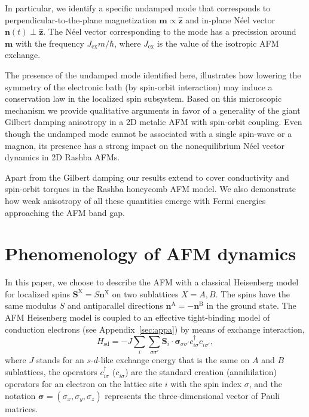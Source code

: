 \documentclass[%
  twocolumn,
  aps,
  prb,
  amsmath,
  amssymb,
  superscriptaddress,
  nofootinbib,
  floatfix
]{revtex4-1}
\newcommand{\s}{\sum\limits}
\newcommand{\be}{\begin{equation}}
\newcommand{\e}{\end{equation}}
\newcommand{\bb}{\boldsymbol}
\newcommand{\h}{^\dagger}
\newcommand{\0}{^{\phantom{\dagger}}}
\begin{document}
In particular, we identify a specific undamped mode that corresponds to perpendicular-to-the-plane magnetization $\bb{m} \propto \hat{\bb{z}}$ and in-plane N\'eel vector $\bb{n}(t) \perp \hat{\bb{z}}$. The N\'eel vector corresponding to the mode has a precission around $\bb{m}$ with the frequency $J_\textrm{ex} m/\hbar$, where $J_\textrm{ex}$ is the value of the isotropic AFM exchange.

The presence of the undamped mode identified here, illustrates how lowering the symmetry of the electronic bath (by spin-orbit interaction) may induce a conservation law in the localized spin subsystem. Based on this microscopic mechanism we provide qualitative arguments in favor of a generality of the giant Gilbert damping anisotropy in a 2D metalic AFM with spin-orbit coupling. Even though the undamped mode cannot be associated with a single spin-wave or a magnon, its presence has a strong impact on the nonequilibrium N\'eel vector dynamics in 2D Rashba AFMs.

Apart from the Gilbert damping our results extend to cover conductivity and spin-orbit torques in the Rashba honeycomb AFM model. We also demonstrate how weak anisotropy of all these quantities emerge with Fermi energies approaching the AFM band gap. 

\section{Phenomenology of AFM dynamics}

In this paper, we choose to describe the AFM with a classical Heisenberg model for localized spins $\bb{S}^\textrm{X}= S \bb{n}^\textrm{X}$ on two sublattices $X=A,B$. The spins have the same modulus $S$ and antiparallel directions $\bb{n}^\textrm{A}=-\bb{n}^\textrm{B}$ in the ground state. The AFM Heisenberg model is coupled to an effective tight-binding model of conduction electrons (see Appendix~\ref{sec:appa}) by means of exchange interaction,
\be
\label{ex}
H_\mathrm{sd}=-J \s_{i} \s_{\sigma\sigma'}\bb{S}_i\cdot \bb{\sigma}_{\sigma\sigma'}c^\dagger_{i\sigma}c\0_{i\sigma'},
\e
where $J$ stands for an $s$-$d$-like exchange energy that is the same on $A$ and $B$ sublattices, the operators $c\h_{i\sigma}$ ($c\0_{i\sigma}$) are the standard creation (annihilation) operators for an electron on the lattice site $i$ with the spin index $\sigma$, and the notation $\bb{\sigma}=(\sigma_x,\sigma_y,\sigma_z)$ represents the three-dimensional vector of Pauli matrices. 
\end{document}
